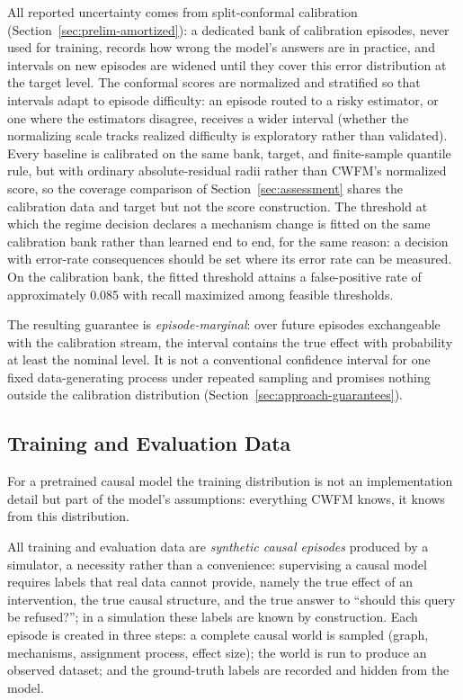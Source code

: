 \documentclass[electronics,article,submit,oneauthor]{Definitions/mdpi}
\begin{document}
All reported uncertainty comes from split-conformal calibration (Section~\ref{sec:prelim-amortized}): a dedicated bank of calibration episodes, never used for training, records how wrong the model's answers are in practice, and intervals on new episodes are widened until they cover this error distribution at the target level. The conformal scores are normalized and stratified so that intervals adapt to episode difficulty: an episode routed to a risky estimator, or one where the estimators disagree, receives a wider interval (whether the normalizing scale tracks realized difficulty is exploratory rather than validated). Every baseline is calibrated on the same bank, target, and finite-sample quantile rule, but with ordinary absolute-residual radii rather than CWFM's normalized score, so the coverage comparison of Section~\ref{sec:assessment} shares the calibration data and target but not the score construction. The threshold at which the regime decision declares a mechanism change is fitted on the same calibration bank rather than learned end to end, for the same reason: a decision with error-rate consequences should be set where its error rate can be measured. On the calibration bank, the fitted threshold attains a false-positive rate of approximately 0.085 with recall maximized among feasible thresholds.


The resulting guarantee is \emph{episode-marginal}: over future episodes exchangeable with the calibration stream, the interval contains the true effect with probability at least the nominal level. It is not a conventional confidence interval for one fixed data-generating process under repeated sampling and promises nothing outside the calibration distribution (Section~\ref{sec:approach-guarantees}).

\subsection{Training and Evaluation Data}\label{sec:approach-data}

For a pretrained causal model the training distribution is not an implementation detail but part of the model's assumptions: everything CWFM knows, it knows from this distribution.

All training and evaluation data are \emph{synthetic causal episodes} produced by a simulator, a necessity rather than a convenience: supervising a causal model requires labels that real data cannot provide, namely the true effect of an intervention, the true causal structure, and the true answer to ``should this query be refused?''; in a simulation these labels are known by construction. Each episode is created in three steps: a complete causal world is sampled (graph, mechanisms, assignment process, effect size); the world is run to produce an observed dataset; and the ground-truth labels are recorded and hidden from the model.
\end{document}
